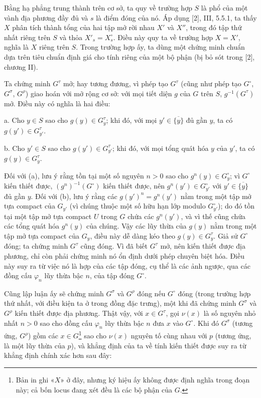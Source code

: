 Bằng hạ phẳng trung thành trên cơ sở, ta quy về trường hợp $S$ là phổ của một
vành địa phương đầy đủ và $s$ là điểm đóng của nó. Áp dụng [2], III, 5.5.1,
ta thấy $X$ phân tích thành tổng của hai tập mở rời nhau $X'$ và $X''$, trong
đó tập thứ nhất riêng trên $S$ và thỏa $X'_s=X_s^\circ$. Điều này quy ta về
trường hợp $X=X'$, nghĩa là $X$ riêng trên $S$. Trong trường hợp ấy, ta dùng
một chứng minh chuẩn dựa trên tiêu chuẩn định giá cho tính riêng của một bộ
phận (bị bỏ sót trong [2], chương II).

Ta chứng minh $G^\tau$ mở; hay tương đương, vì phép tạo $G^\tau$ (cũng như
phép tạo $G^\circ$, $G^\sigma$, $G^\rho$) giao hoán với mở rộng cơ sở: với
mọi tiết diện $g$ của $G$ trên $S$, $g^{-1}(G^\tau)$ mở. Điều này có nghĩa là
hai điều:

\medskip
\noindent a. Cho $y\in S$ sao cho $g(y)\in G_y^\tau$; khi đó, với mọi
$y'\in\overline{\{y\}}$ đủ gần $y$, ta có $g(y')\in G_{y'}^\tau$.

\medskip
\noindent b. Cho $y'\in S$ sao cho $g(y')\in G_{y'}^\tau$; khi đó, với mọi
tổng quát hóa $y$ của $y'$, ta có $g(y)\in G_y^\tau$.

Đối với (a), lưu ý rằng tồn tại một số nguyên $n>0$ sao cho
$g^n(y)\in G_y^\circ$; vì $G^\circ$ kiến thiết được,
$(g^n)^{-1}(G^\circ)$ kiến thiết được, nên
$g^n(y')\in G_{y'}^\circ$ với $y'\in\overline{\{y\}}$ đủ gần $y$. Đối với
(b), lưu ý rằng các $g(y')^n=g^n(y')$ nằm trong một tập mở tựa compact của
$G_{y'}$ (vì chúng thuộc một số hữu hạn lớp modulo $G_{y'}^\circ$); do đó tồn
tại một tập mở tựa compact $U$ trong $G$ chứa các $g^n(y')$, và vì thế cũng
chứa các tổng quát hóa $g^n(y)$ của chúng. Vậy các lũy thừa của $g(y)$ nằm
trong một tập mở tựa compact của $G_y$, điều này dễ dàng kéo theo
$g(y)\in G_y^\tau$.
Giả sử $G^\circ$ đóng; ta chứng minh $G^\tau$ cũng đóng. Vì đã biết
$G^\tau$ mở, nên kiến thiết được địa phương, chỉ còn phải chứng minh nó ổn
định dưới phép chuyên biệt hóa. Điều này suy ra từ việc nó là hợp của các tập
đóng, cụ thể là các ảnh ngược, qua các đồng cấu $\varphi_n$ lũy thừa bậc
$n$, của tập đóng $G^\circ$.

Cũng lập luận ấy sẽ chứng minh $G^\sigma$ và $G^\rho$ đóng nếu $G^\circ$
đóng (trong trường hợp thứ nhất, với điều kiện ta ở trong đồng đặc trưng), một
khi đã chứng minh $G^\sigma$ và $G^\rho$ kiến thiết được địa phương. Thật vậy,
với $x\in G^\tau$, gọi $\nu(x)$ là số nguyên nhỏ nhất $n>0$ sao cho đồng cấu
$\varphi_n$ lũy thừa bậc $n$ đưa $x$ vào $G^\circ$. Khi đó $G^\sigma$
(tương ứng, $G^\rho$) gồm các $x\in G$\footnote{Bản in ghi «$X$» ở đây,
nhưng ký hiệu ấy không được định nghĩa trong đoạn này; cả bốn locus đang xét đều là
các bộ phận của $G$.} sao cho $\nu(x)$ nguyên tố cùng nhau với $p$ (tương ứng,
là một lũy thừa của $p$), và khẳng định của ta về tính kiến thiết được suy ra
từ khẳng định chính xác hơn sau đây:

